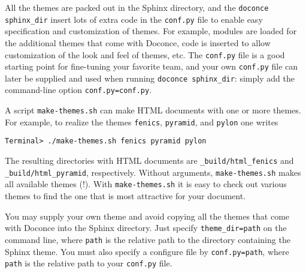 \documentclass[%
oneside,                 %
final,                   %
10pt]{article}
\begin{document}
All the themes are packed out in the Sphinx directory, and the
{\fontsize{10pt}{10pt}\Verb!doconce sphinx_dir!} insert lots of extra code in the {\fontsize{10pt}{10pt}\Verb!conf.py!}
file to enable easy specification and customization of themes.
For example, modules are loaded for the additional themes that
come with Doconce, code is inserted to allow customization of
the look and feel of themes, etc. The {\fontsize{10pt}{10pt}\Verb!conf.py!} file is a
good starting point for fine-tuning your favorite team, and your
own {\fontsize{10pt}{10pt}\Verb!conf.py!} file can later be supplied and used when running
{\fontsize{10pt}{10pt}\Verb!doconce sphinx_dir!}: simply add the command-line option
{\fontsize{10pt}{10pt}\Verb!conf.py=conf.py!}.

A script
{\fontsize{10pt}{10pt}\Verb!make-themes.sh!} can make HTML documents with one or more themes.
For example,
to realize the themes {\fontsize{10pt}{10pt}\Verb!fenics!}, {\fontsize{10pt}{10pt}\Verb!pyramid!}, and {\fontsize{10pt}{10pt}\Verb!pylon!} one writes
\vspace{4pt}
\begin{Verbatim}[numbers=none,frame=lines,fontsize=\fontsize{9pt}{9pt},labelposition=topline,framesep=2.5mm,framerule=0.7pt]
Terminal> ./make-themes.sh fenics pyramid pylon
\end{Verbatim}
The resulting directories with HTML documents are {\fontsize{10pt}{10pt}\Verb!_build/html_fenics!}
and {\fontsize{10pt}{10pt}\Verb!_build/html_pyramid!}, respectively. Without arguments,
{\fontsize{10pt}{10pt}\Verb!make-themes.sh!} makes all available themes (!). With {\fontsize{10pt}{10pt}\Verb!make-themes.sh!}
it is easy to check out various themes to find the one that is most
attractive for your document.

You may supply your own theme and avoid copying all the themes
that come with Doconce into the Sphinx directory. Just specify
{\fontsize{10pt}{10pt}\Verb!theme_dir=path!} on the command line, where {\fontsize{10pt}{10pt}\Verb!path!} is the relative
path to the directory containing the Sphinx theme. You must also
specify a configure file by {\fontsize{10pt}{10pt}\Verb!conf.py=path!}, where {\fontsize{10pt}{10pt}\Verb!path!} is the
relative path to your {\fontsize{10pt}{10pt}\Verb!conf.py!} file.
\end{document}
